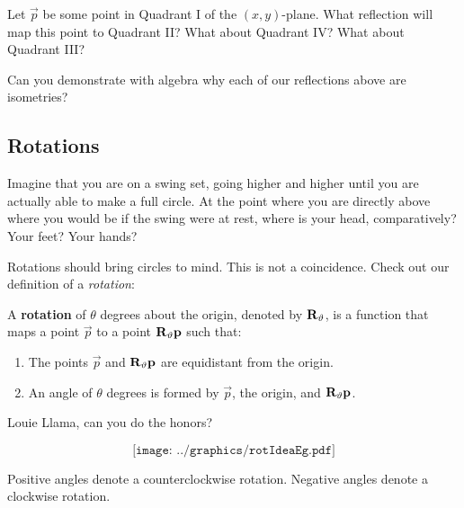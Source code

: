 \begin{question}
Let $\vec{p}$ be some point in Quadrant I of the $(x,y)$-plane. What
reflection will map this point to Quadrant II? What about Quadrant IV?
What about Quadrant III?
\end{question}
\QM


\begin{question} 
Can you demonstrate with algebra why each of our reflections above are
isometries?
\end{question}
\QM




\subsection{Rotations}

Imagine that you are on a swing set, going higher and higher until you
are actually able to make a full circle. At the point where you are directly above where you would be
if the swing were at rest, where is your head, comparatively?  Your
feet?  Your hands?


Rotations should bring circles to mind. This is not a
coincidence. Check out our definition of a \textit{rotation}:

\begin{definition}
A \textbf{rotation} of $\theta$ degrees about the origin, denoted by
$\mathbf{R}_\vartheta$, is a function that maps a point $\vec{p}$ to a point
$\mathbf{R}_\vartheta \mathbf{p}$ such that:
\begin{enumerate}
\item The points $\vec{p}$ and $\mathbf{R}_\vartheta \mathbf{p}$ are equidistant
  from the origin.
\item An angle of $\theta$ degrees is formed by $\vec{p}$, the origin, and
  $\mathbf{R}_\vartheta\mathbf{p}$.
\end{enumerate}
Louie Llama, can you do the honors?
\end{definition}
\[
\texttt{[image: ../graphics/rotIdeaEg.pdf]}
\]
\begin{warning} 
Positive angles denote a counterclockwise rotation. Negative angles
denote a clockwise rotation.
\end{warning}

